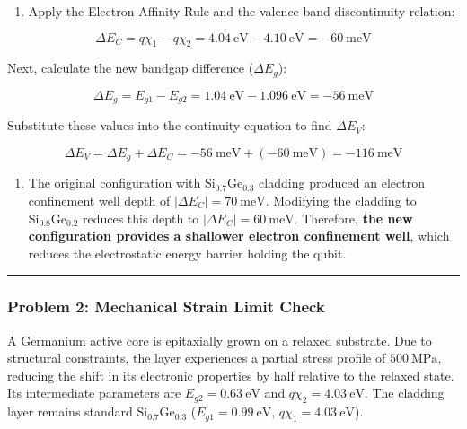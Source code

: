 \documentclass[
]{article}
\providecommand{\tightlist}{%
  \setlength{\itemsep}{0pt}\setlength{\parskip}{0pt}}
\begin{document}
\begin{enumerate}
\def\labelenumi{\arabic{enumi}.}
\tightlist
\item
  Apply the Electron Affinity Rule and the valence band discontinuity
  relation:
\end{enumerate}

\[\Delta E_C = q\chi_1 - q\chi_2 = 4.04\ \text{eV} - 4.10\ \text{eV} = -60\ \text{meV}\]

Next, calculate the new bandgap difference (\(\Delta E_g\)):

\[\Delta E_g = E_{g1} - E_{g2} = 1.04\ \text{eV} - 1.096\ \text{eV} = -56\ \text{meV}\]

Substitute these values into the continuity equation to find
\(\Delta E_V\):

\[\Delta E_V = \Delta E_g + \Delta E_C = -56\ \text{meV} + (-60\ \text{meV}) = -116\ \text{meV}\]

\begin{enumerate}
\def\labelenumi{\arabic{enumi}.}
\setcounter{enumi}{1}
\tightlist
\item
  The original configuration with \(\text{Si}_{0.7}\text{Ge}_{0.3}\)
  cladding produced an electron confinement well depth of
  \(|\Delta E_C| = 70\ \text{meV}\). Modifying the cladding to
  \(\text{Si}_{0.8}\text{Ge}_{0.2}\) reduces this depth to
  \(|\Delta E_C| = 60\ \text{meV}\). Therefore, \textbf{the new
  configuration provides a shallower electron confinement well}, which
  reduces the electrostatic energy barrier holding the qubit.
\end{enumerate}

\begin{center}\rule{0.5\linewidth}{0.5pt}\end{center}

\subsubsection{Problem 2: Mechanical Strain Limit
Check}\label{problem-2-mechanical-strain-limit-check}

A Germanium active core is epitaxially grown on a relaxed substrate. Due
to structural constraints, the layer experiences a partial stress
profile of \(500\ \text{MPa}\), reducing the shift in its electronic
properties by half relative to the relaxed state. Its intermediate
parameters are \(E_{g2} = 0.63\ \text{eV}\) and
\(q\chi_2 = 4.03\ \text{eV}\). The cladding layer remains standard
\(\text{Si}_{0.7}\text{Ge}_{0.3}\) (\(E_{g1} = 0.99\ \text{eV}\),
\(q\chi_1 = 4.03\ \text{eV}\)).
\end{document}
